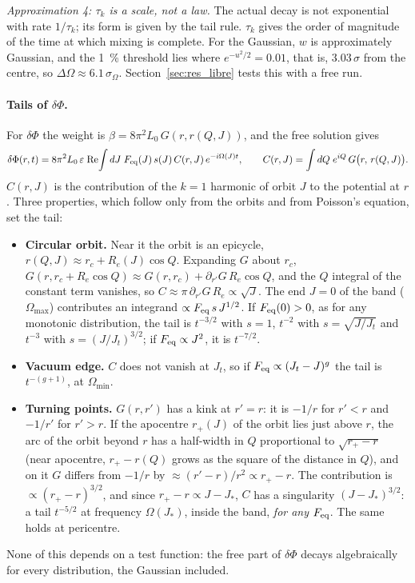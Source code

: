 \documentclass[11pt,a4paper]{article}
\begin{document}
\emph{Approximation 4: $\tau_k$ is a scale, not a law.}
\label{sec:tau}
The actual decay is not exponential with rate $1/\tau_k$; its form is given by the tail
rule. $\tau_k$ gives the order of magnitude of the time at which mixing is complete. For
the Gaussian, $w$ is approximately Gaussian, and the \SI{1}{\%} threshold lies where
$e^{-u^2/2}=0.01$, that is, $3.03\,\sigma$ from the centre, so $\Delta\Omega\approx6.1\,\sigma_\Omega$.
Section~\ref{sec:res_libre} tests this with a free run.

\paragraph{Tails of $\delta\Phi$.}
\label{sec:colasdphi}
For $\delta\Phi$ the weight is $\beta=8\pi^2L_0\,G(r,r(Q,J))$, and the free solution gives
\[
  \delta\Phi(r,t) = 8\pi^2L_0\,\varepsilon\;
  \mathrm{Re}\!\int dJ\;F_{\rm eq}(J)\,s(J)\,C(r,J)\,e^{-i\Omega(J)t},
  \qquad
  C(r,J) = \int dQ\;e^{iQ}\,G\big(r,\,r(Q,J)\big).
\]
$C(r,J)$ is the contribution of the $k=1$ harmonic of orbit $J$ to the potential at $r$.
Three properties, which follow only from the orbits and from Poisson's equation, set the
tail:
\begin{itemize}
\item \textbf{Circular orbit.} Near it the orbit is an epicycle,
$r(Q,J)\approx r_c+R_e(J)\cos Q$. Expanding $G$ about $r_c$,
$G(r,r_c+R_e\cos Q)\approx G(r,r_c)+\partial_{r'}G\,R_e\cos Q$, and the $Q$ integral of the
constant term vanishes, so $C\approx\pi\,\partial_{r'}G\,R_e\propto\sqrt J$. The end $J=0$ of the
band ($\Omega_{\max}$) contributes an integrand $\propto F_{\rm eq}\,s\,J^{1/2}$. If $F_{\rm eq}(0)>0$,
as for any monotonic distribution, the tail is $t^{-3/2}$ with $s=1$, $t^{-2}$ with
$s=\sqrt{J/J_t}$ and $t^{-3}$ with $s=(J/J_t)^{3/2}$; if $F_{\rm eq}\propto J^2$, it is $t^{-7/2}$.
\item \textbf{Vacuum edge.} $C$ does not vanish at $J_t$, so if $F_{\rm eq}\propto(J_t-J)^g$ the
tail is $t^{-(g+1)}$, at $\Omega_{\min}$.
\item \textbf{Turning points.} $G(r,r')$ has a kink at $r'=r$: it is $-1/r$ for $r'<r$ and
$-1/r'$ for $r'>r$. If the apocentre $r_+(J)$ of the orbit lies just above $r$, the arc of
the orbit beyond $r$ has a half-width in $Q$ proportional to $\sqrt{r_+-r}$ (near apocentre,
$r_+-r(Q)$ grows as the square of the distance in $Q$), and on it $G$ differs from $-1/r$ by
$\approx(r'-r)/r^2\propto r_+-r$. The contribution is $\propto(r_+-r)^{3/2}$, and since
$r_+-r\propto J-J_*$, $C$ has a singularity $(J-J_*)^{3/2}$: a tail $t^{-5/2}$ at frequency
$\Omega(J_*)$, inside the band, \emph{for any} $F_{\rm eq}$. The same holds at pericentre.
\end{itemize}
None of this depends on a test function: the free part of $\delta\Phi$ decays
algebraically for every distribution, the Gaussian included.
\end{document}
